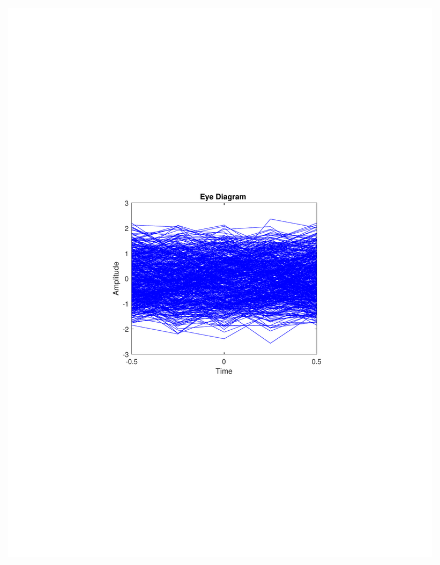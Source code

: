 \begin{refsection}
\begin{figure}[H]
\begin{minipage}{0.30\textwidth}
		\includegraphics[clip, trim=4cm 8cm 4cm 8cm, width=1\textwidth]{./sdf/m_qam_system/figures/expResults/homodyne/1_eye_4GBdInSig13dBc_AfFec.pdf}
		\label{fig:4GBdSpecAftFec}
	\end{minipage}
	\begin{minipage}{0.30\textwidth}
		\centering

\end{minipage}
\end{figure}
\end{refsection}
